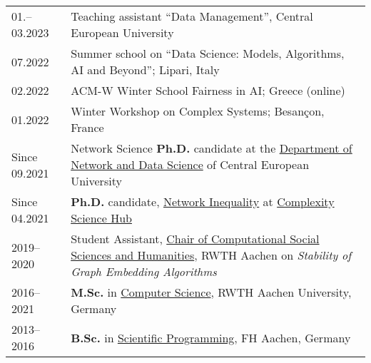 

\renewcommand{\thefootnote}{\fnsymbol{footnote}}
\setcounter{footnote}{0}

\begin{longtable}[l]{@{}p{} p{}}
    01.–03.2023 & Teaching assistant “Data Management”, Central European University\\
    07.2022     & Summer school on “Data Science: Models, Algorithms, AI and 		 Beyond”; Lipari, Italy\\
    02.2022     & ACM-W Winter School Fairness in AI; Greece (online)\\
    01.2022	    & Winter Workshop on Complex Systems; Besançon, France\\

    Since 09.2021 & Network Science \textbf{Ph.D.} candidate at the \href{https://networkdatascience.ceu.edu/}{Department of Network and Data Science} of Central European University \\

    Since 04.2021 & \textbf{Ph.D.} candidate, \href{https://networkinequality.com/}{Network Inequality} at \href{https://csh.ac.at}{Complexity Science Hub} \\

    2019--2020 & Student Assistant, \href{https://cssh.rwth-aachen.de/}{Chair of Computational Social Sciences and Humanities}, RWTH Aachen on \emph{Stability of Graph Embedding Algorithms}\cite{}\\

    2016--2021 & \textbf{M.Sc.} in \href{https://www.informatik.rwth-aachen.de/}{Computer Science}, RWTH Aachen University, Germany\\

    2013--2016 & \textbf{B.Sc.} in \href{https://www.fh-aachen.de/en/studies/degree-programmes/applied-mathematics-and-computer-science-dual-bsc}{Scientific Programming}, FH Aachen, Germany\\



\end{longtable}
